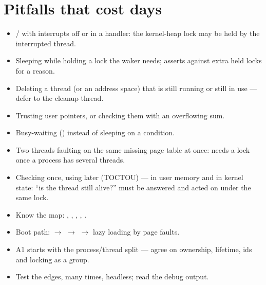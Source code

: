 \section{Pitfalls that cost days}

\begin{itemize}
  \item {}/ with interrupts off or in a handler: the
    kernel-heap lock may be held by the interrupted thread.
  \item Sleeping while holding a lock the waker needs; 
    asserts against extra held locks for a reason.
  \item Deleting a thread (or an address space) that is still running or
    still in use --- defer to the cleanup thread.
  \item Trusting user pointers, or checking them with an overflowing sum.
  \item Busy-waiting () instead of sleeping on a
    condition.
  \item Two threads faulting on the same missing page table at once:
     needs a lock once a process has several threads.
  \item Checking once, using later (TOCTOU) --- in user memory and in
    kernel state: ``is the thread still alive?'' must be answered and acted
    on under the same lock.
\end{itemize}

\begin{keybox}
\begin{itemize}
  \item Know the map: , ,
    , , .
  \item Boot path:  $\to$  $\to$
     $\to$ lazy loading by page faults.
  \item A1 starts with the process/thread split --- agree on ownership,
    lifetime, ids and locking as a group.
  \item Test the edges, many times, headless; read the debug output.
\end{itemize}
\end{keybox}

